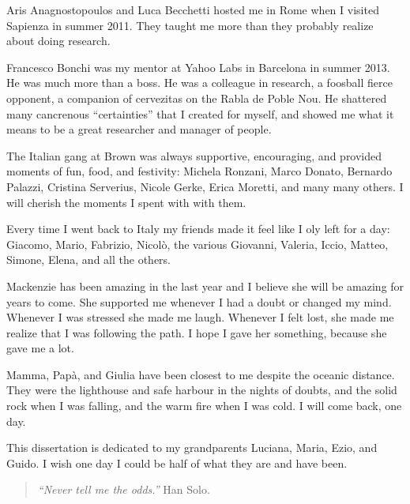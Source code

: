Aris Anagnostopoulos and Luca Becchetti hosted me in Rome when I visited
Sapienza in summer 2011. They taught me more than they probably realize about
doing research. 

Francesco Bonchi was my mentor at Yahoo Labs in Barcelona in summer 2013. He
was much more than a boss. He was a colleague in research, a foosball fierce
opponent, a companion of cervezitas on the Rabla de Poble Nou.  He shattered
many cancrenous ``certainties'' that I created for myself, and showed me what it
means to be a great researcher and manager of people.

The Italian gang at Brown was always supportive, encouraging, and provided
moments of fun, food, and festivity:  Michela Ronzani, Marco Donato, Bernardo
Palazzi, Cristina Serverius, Nicole Gerke, Erica Moretti, and many many others.
I will cherish the moments I spent with with them.

Every time I went back to Italy my friends made it feel like I oly
left for a day: Giacomo, Mario, Fabrizio, Nicol\`o, the various Giovanni,
Valeria, Iccio, Matteo, Simone, Elena, and all the others. 

Mackenzie has been amazing in the last year and I believe she will be
amazing for years to come. She supported me whenever I had a doubt or changed
my mind. Whenever I was stressed she made me laugh. Whenever I felt lost, she
made me realize that I was following the path. I hope I gave her something,
because she gave me a lot.

Mamma, Pap\`a, and Giulia have been closest to me despite the oceanic distance.
They were the lighthouse and safe harbour in the nights of doubts, and the solid
rock when I was falling, and the warm fire when I was cold. I will come back,
one day.

This dissertation is dedicated to my grandparents Luciana, Maria, Ezio, and
Guido. I wish one day I could be half of what they are and have been.

\begin{quote}
  {\em ``Never tell me the odds.''} Han Solo.
\end{quote}

